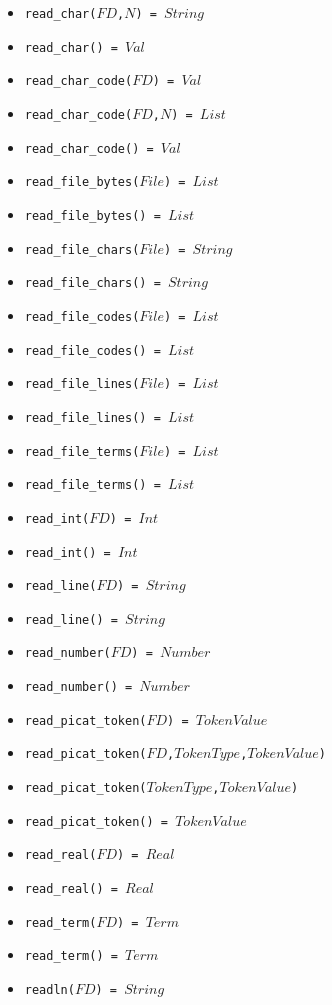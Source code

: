 \documentclass[10pt]{article}
\begin{document}
\begin{multicols}{2}
\begin{scriptsize}
\begin{itemize}
   \item \texttt{read\_char($FD$,$N$) = $String$}
   \item \texttt{read\_char() = $Val$}
   \item \texttt{read\_char\_code($FD$) = $Val$}
   \item \texttt{read\_char\_code($FD$,$N$) = $List$}
   \item \texttt{read\_char\_code() = $Val$}
   \item \texttt{read\_file\_bytes($File$) = $List$}
   \item \texttt{read\_file\_bytes() = $List$}
   \item \texttt{read\_file\_chars($File$) = $String$}
   \item \texttt{read\_file\_chars() = $String$}
   \item \texttt{read\_file\_codes($File$) = $List$}
   \item \texttt{read\_file\_codes() = $List$}
   \item \texttt{read\_file\_lines($File$) = $List$}
   \item \texttt{read\_file\_lines() = $List$}
   \item \texttt{read\_file\_terms($File$) = $List$}
   \item \texttt{read\_file\_terms() = $List$}
   \item \texttt{read\_int($FD$) = $Int$}
   \item \texttt{read\_int() = $Int$}
   \item \texttt{read\_line($FD$) = $String$}
   \item \texttt{read\_line() = $String$}
   \item \texttt{read\_number($FD$) = $Number$}
   \item \texttt{read\_number() = $Number$}
   \item \texttt{read\_picat\_token($FD$) = $TokenValue$}
   \item \texttt{read\_picat\_token($FD$,$TokenType$,$TokenValue$)}
   \item \texttt{read\_picat\_token($TokenType$,$TokenValue$)}
   \item \texttt{read\_picat\_token() = $TokenValue$}
   \item \texttt{read\_real($FD$) = $Real$}
   \item \texttt{read\_real() = $Real$}
   \item \texttt{read\_term($FD$) = $Term$}
   \item \texttt{read\_term() = $Term$}
   \item \texttt{readln($FD$) = $String$}

\end{itemize}
\end{scriptsize}
\end{multicols}
\end{document}
